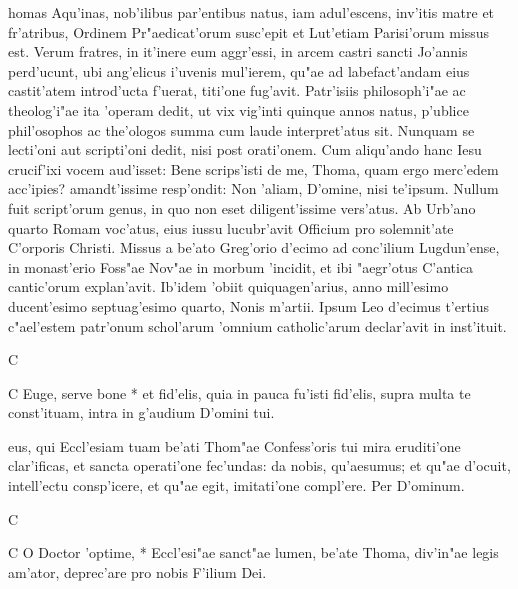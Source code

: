 \documentclass{article}
\begin{document}
\begin{multicols}{2}

\latinpart



homas Aqu'inas, nob'ilibus par'entibus natus, iam
adul'escens, inv'itis matre et fr'atribus, Ordinem Pr"aedicat'orum
susc'epit et Lut'etiam Parisi'orum missus est.  Verum fratres, in
it'inere eum aggr'essi, in arcem castri sancti Jo'annis perd'ucunt,
ubi ang'elicus i'uvenis mul'ierem, qu"ae ad labefact'andam eius
castit'atem introd'ucta f'uerat, titi'one fug'avit.  Patr'isiis
philosoph'i"ae ac theolog'i"ae ita 'operam dedit, ut vix vig'inti
quinque annos natus, p'ublice phil'osophos ac the'ologos summa cum
laude interpret'atus sit.  Nunquam se lecti'oni aut scripti'oni
dedit, nisi post orati'onem.  Cum aliqu'ando hanc Iesu crucif'ixi
vocem aud'isset:  Bene scrips'isti de me, Thoma, quam ergo
merc'edem acc'ipies? amandt'issime resp'ondit: Non 'aliam, D'omine,
nisi te'ipsum.  Nullum fuit script'orum genus, in quo non eset
diligent'issime vers'atus.  Ab Urb'ano quarto Romam voc'atus, eius
iussu lucubr'avit Officium pro solemnit'ate C'orporis Christi.
Missus a be'ato Greg'orio d'ecimo ad conc'ilium Lugdun'ense, in
monast'erio Foss"ae Nov"ae in morbum 'incidit, et ibi "aegr'otus
C'antica cantic'orum explan'avit.  Ib'idem 'obiit quiquagen'arius,
anno mill'esimo ducent'esimo septuag'esimo quarto, Nonis m'artii.
Ipsum Leo d'ecimus t'ertius c"ael'estem patr'onum schol'arum
'omnium catholic'arum declar'avit in inst'ituit.



C    

C    Euge, serve bone * et fid'elis,
quia in pauca fu'isti fid'elis, supra multa te const'ituam, intra
in g'audium D'omini tui.


eus, qui Eccl'esiam tuam be'ati Thom"ae Confess'oris
tui mira eruditi'one clar'ificas, et sancta operati'one fec'undas:
da nobis, qu'aesumus; et qu"ae d'ocuit, intell'ectu consp'icere, et
qu"ae egit, imitati'one compl'ere.  Per D'ominum.


C    

C    O Doctor 'optime, * Eccl'esi"ae
sanct"ae lumen, be'ate Thoma, div'in"ae legis am'ator, deprec'are
pro nobis F'ilium Dei.

\end{multicols}
\end{document}
